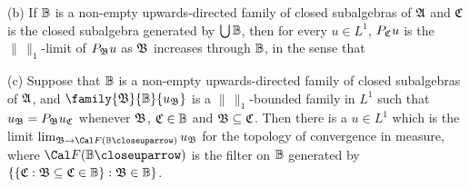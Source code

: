 (b) If $\Bbb B$ is a non-empty upwards-directed family of closed
subalgebras of $\frak A$ and $\frak C$ is the closed subalgebra generated
by $\bigcup\Bbb B$, then for every 
$u\in L^1$, $P_{\frak C}u$ is the $\|\,\|_1$-limit of $P_{\frak B}u$ as
$\frak B$ increases through $\Bbb B$, in the sense that


(c) Suppose that $\Bbb B$ is a non-empty upwards-directed family of closed
subalgebras of $\frak A$, and $\family{\frak B}{\Bbb B}{u_{\frak B}}$ is a
$\|\,\|_1$-bounded family in $L^1$ such that 
$u_{\frak B}=P_{\frak B}u_{\frak C}$ whenever $\frak B$, 
$\frak C\in\Bbb B$ and $\frak B\subseteq\frak C$.   Then
there is a $u\in L^1$ which is the limit 
$\lim_{\frak B\to\Cal F(\Bbb B\closeuparrow)}u_{\frak B}$ 
for the topology of convergence in measure, where 
$\Cal F(\Bbb B\closeuparrow)$ is the filter on $\Bbb B$ generated by 
$\{\{\frak C:\frak B\subseteq\frak C\in\Bbb B\}:\frak B\in\Bbb B\}$.



